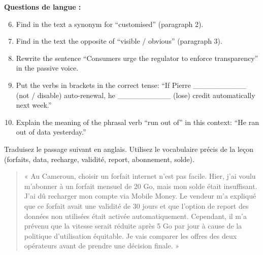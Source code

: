 \documentclass[11pt]{article}
\newcommand{\cle}[1]{{\popxbold\color{popdark}#1}}
\begin{document}
\begin{exercice}
\textbf{Questions de langue :}
\begin{enumerate}
    \setcounter{enumi}{5}
    \item Find in the text a synonym for “customised” (paragraph 2).
    \item Find in the text the opposite of “visible / obvious” (paragraph 3).
    \item Rewrite the sentence “Consumers urge the regulator to enforce transparency” in the passive voice.
    \item Put the verbs in brackets in the correct tense: “If Pierre \_\_\_\_\_\_\_\_\_\_ (not / disable) auto-renewal, he \_\_\_\_\_\_\_\_\_\_ (lose) credit automatically next week.”
    \item Explain the meaning of the phrasal verb “\cle{run out of}” in this context: “He ran out of data yesterday.”
\end{enumerate}
\end{exercice}

\begin{exercice}
Traduisez le passage suivant en anglais. Utilisez le vocabulaire précis de la leçon (forfaits, data, recharge, validité, report, abonnement, solde).

\begin{quote}
« Au Cameroun, choisir un forfait internet n'est pas facile. Hier, j'ai voulu m'abonner à un forfait mensuel de 20 Go, mais mon solde était insuffisant. J'ai dû recharger mon compte via Mobile Money. Le vendeur m'a expliqué que ce forfait avait une validité de 30 jours et que l'option de report des données non utilisées était activée automatiquement. Cependant, il m'a prévenu que la vitesse serait réduite après 5 Go par jour à cause de la politique d'utilisation équitable. Je vais comparer les offres des deux opérateurs avant de prendre une décision finale. »
\end{quote}
\end{exercice}
\end{document}
